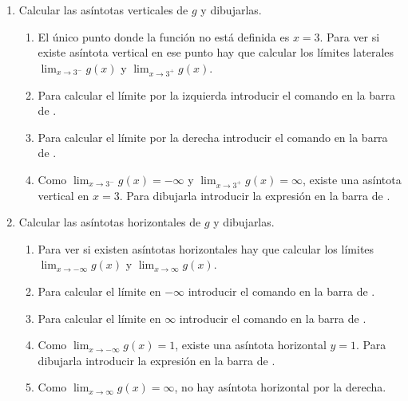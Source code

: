 \begin{enumerate}[leftmargin=*]
\begin{enumerate}
      \item Calcular las asíntotas verticales de $g$ y dibujarlas.
            \begin{indication}
            \begin{enumerate}
            \item El único punto donde la función no está definida es $x=3$.
                  Para ver si existe asíntota vertical en ese punto hay que calcular los límites laterales $\lim_{x\rightarrow 3^-}g(x)$ y $\lim_{x\rightarrow 3^+}g(x)$.
            \item Para calcular el límite por la izquierda introducir el comando  en la barra de .
            \item Para calcular el límite por la derecha introducir el comando  en la barra de .
            \item Como $\lim_{x\rightarrow 3^-}g(x)=-\infty$ y $\lim_{x\rightarrow 3^+}g(x)=\infty$, existe una asíntota vertical en $x=3$.
                  Para dibujarla introducir la expresión  en la barra de .
            \end{enumerate}
            \end{indication}

      \item Calcular las asíntotas horizontales de $g$ y dibujarlas.
            \begin{indication}
            \begin{enumerate}
            \item Para ver si existen asíntotas horizontales hay que calcular los límites $\lim_{x\rightarrow -\infty} g(x)$ y $\lim_{x\rightarrow \infty} g(x)$.
            \item Para calcular el límite en $-\infty$ introducir el comando  en la barra de .
            \item Para calcular el límite en $\infty$ introducir el comando  en la barra de .
            \item Como $\lim_{x\rightarrow -\infty} g(x)=1$, existe una asíntota horizontal $y=1$.
                  Para dibujarla introducir la expresión  en la barra de .
            \item Como $\lim_{x\rightarrow \infty} g(x)=\infty$, no hay asíntota horizontal por la derecha.
            \end{enumerate}
            \end{indication}


\end{enumerate}
\end{enumerate}

